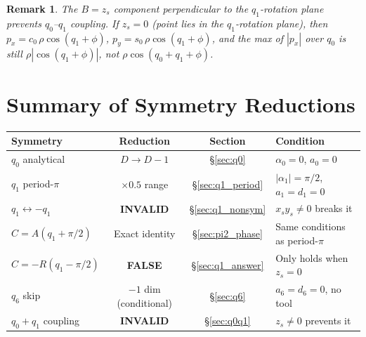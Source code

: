 \documentclass[11pt,a4paper]{article}
\newtheorem{remark}{Remark}[section]
\begin{document}
\begin{remark}
The $B = z_s$ component perpendicular to the $q_1$-rotation plane prevents
$q_0$--$q_1$ coupling. If $z_s = 0$ (point lies in the $q_1$-rotation
plane), then $p_x = c_0\,\rho\cos(q_1+\phi)$,
$p_y = s_0\,\rho\cos(q_1+\phi)$, and the max of $|p_x|$ over $q_0$ is
still $\rho|\cos(q_1+\phi)|$, not $\rho\cos(q_0+q_1+\phi)$.
\end{remark}


\section{Summary of Symmetry Reductions}\label{sec:summary}

\begin{center}
\begin{tabular}{l|c|c|l}
\toprule
Symmetry & Reduction & Section & Condition \\
\midrule
$q_0$ analytical & $D \to D-1$ & \S\ref{sec:q0} & $\alpha_0=0$, $a_0=0$ \\
$q_1$ period-$\pi$ & $\times 0.5$ range & \S\ref{sec:q1_period}
  & $|\alpha_1|=\pi/2$, $a_1=d_1=0$ \\
$q_1 \leftrightarrow -q_1$ & \textbf{INVALID} & \S\ref{sec:q1_nonsym}
  & $x_s y_s \ne 0$ breaks it \\
$C = A(q_1+\pi/2)$ & Exact identity & \S\ref{sec:pi2_phase}
  & Same conditions as period-$\pi$ \\
$C = -R(q_1-\pi/2)$ & \textbf{FALSE} & \S\ref{sec:q1_answer}
  & Only holds when $z_s = 0$ \\
$q_6$ skip & $-1$ dim (conditional) & \S\ref{sec:q6}
  & $a_6=d_6=0$, no tool \\
$q_0+q_1$ coupling & \textbf{INVALID} & \S\ref{sec:q0q1}
  & $z_s \ne 0$ prevents it \\
\bottomrule
\end{tabular}
\end{center}
\end{document}
